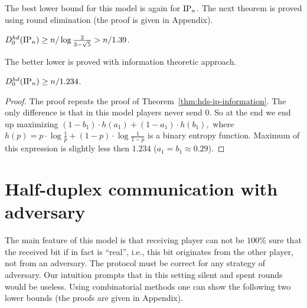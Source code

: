 The best lower bound for this model is again for $\mathrm{IP}_n$. The next theorem is proved using round elimination (the proof is given in Appendix).
\begin{theorem}\label{thm:hdz-ip}
$D^{hd}_0(\mathrm{IP}_n)\ge n / \log \frac{2}{3 - \sqrt{5}} > n/1.39$.
\end{theorem}
The better lower is proved with information theoretic approach.
\begin{theorem}\label{thm:hdz-ip-information}
$D^{hd}_0(\mathrm{IP}_n)\ge n/1.234$.
\end{theorem}
\begin{proof}
The proof repeats the proof of Theorem~\ref{thm:hds-ip-information}.
The only difference is that in this model players never send 0. So at the end
we end up maximizing 
$
(1 - b_1) \cdot h(a_1) + (1 - a_1) \cdot h(b_1),
$
where $h(p) = p\cdot\log\frac{1}{p} + (1 - p)\cdot\log\frac{1}{1 - p}$ is a binary entropy function. Maximum of this expression is slightly less then $1.234$ ($a_1 = b_1 \approx 0.29$).
\end{proof}

\section{Half-duplex communication with adversary}\label{sec:hda}
The main feature of this model is that receiving player can not be $100\%$ sure that
the received bit if in fact is ``real'', i.e., this bit originates from the other player,
not from an adversary. The protocol must be correct for any strategy of adversary.
Our intuition prompts that in this setting silent and spent rounds would be useless.
Using combinatorial methods one can show the following two lower bounds (the proofs are given in Appendix).


